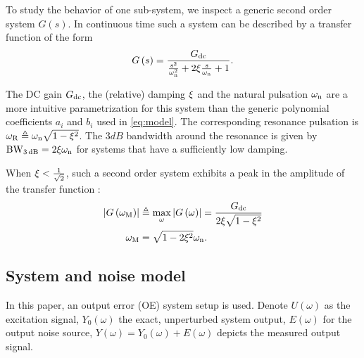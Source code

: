   To study the behavior of one sub-system, we inspect a generic second order system $G\left( s \right)$.
  In continuous time such a system can be described by a transfer function of the form
  \begin{equation}
    G\left(s \right) = \frac{G_{\mathrm{dc}}}
                            {             \frac{s^2}
                                               {\omega_{\mathrm{n}}^2} 
                             + 2 \xi \frac{s}
                                               {\omega_{\mathrm{n}}}
                             + 1
                            }
  \text{.}
  \label{eq:secondOrderSystemCT}
  \end{equation}

  The DC gain $G_{\mathrm{dc}}$, the (relative) damping $\xi$ and the natural pulsation $\omega_{\mathrm{n}}$ are a more intuitive parametrization for this system than the generic polynomial coefficients $a_i$ and $b_i$ used in \eqref{eq:model}.
  The corresponding resonance pulsation is $\omega_{\mathrm{R}} \triangleq \omega_{\mathrm{n}} \sqrt{1-\xi^2}$.
  The $3\unit{dB}$ bandwidth around the resonance is given by $\mathrm{BW}_{3\,\mathrm{dB}} = 2\xi\omega_{\mathrm{n}}$ for systems that have a sufficiently low damping.
  
  When $\xi < \frac{1}{\sqrt{2}}$, such a second order system exhibits a peak in
  the amplitude of the transfer function \citep{Oppenheim1983}:
  \begin{align}
   \left| G\left(\omega_{\mathrm{M}} \right) \right| & \triangleq
          \max_{\omega} \left| G\left( \omega \right)  \right|
        = \frac{G_{\mathrm{dc}}}
               {2 \xi \sqrt{1-\xi^2}}
               \label{eq:peakAmplitude}\\
   \omega_{\mathrm{M}} &
        = \sqrt{1-2\xi^2} \omega_{\mathrm{n}}
        \label{eq:peakFrequency}
    \text{.}
  \end{align}

\subsection{System and noise model}
  In this paper, an output error (OE) system setup is used.
  Denote
    $U  \left(\omega\right)$ as the excitation signal,
    $Y_0\left(\omega\right)$ the exact, unperturbed system output,
    $E  \left(\omega\right)$ for the output noise source,
    $Y  \left(\omega\right) = Y_0\left( \omega \right) + E\left( \omega \right)$ depicts the measured output signal.

